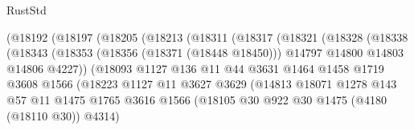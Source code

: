 \begin{lexlean}{RustStd}
\begin{coremodule}
{\begin{coremodule}
{{{{{{{{{{{{{{{{{{{{{{{{{{{{{{{                          (@18192
                            (@18197
                              (@18205
                                (@18213
                                  (@18311
                                    (@18317
                                      (@18321
                                        (@18328
                                          (@18338
                                            (@18343
                                              (@18353
                                                (@18356 (@18371 (@18448 @18450)))
                                                @14797
                                                @14800
                                                @14803
                                                @14806
                                                @4227))
                                            (@18093
                                              @1127
                                              @136
                                              @11
                                              @44
                                              @3631
                                              @1464
                                              @1458
                                              @1719
                                              @3608
                                              @1566
                                              (@18223
                                                @1127
                                                @11
                                                @3627
                                                @3629
                                                (@14813
                                                  @18071
                                                  @1278
                                                  @143
                                                  @57
                                                  @11
                                                  @1475
                                                  @1765
                                                  @3616
                                                  @1566
                                                  (@18105
                                                    @30
                                                    @922
                                                    @30
                                                    @1475
                                                    (@4180 (@18110 @30))
                                                    @4314)
}}}}}}}}}}}}}}}}}}}}}}}}}}}}}}}
\end{coremodule}}
\end{coremodule}
\end{lexlean}
